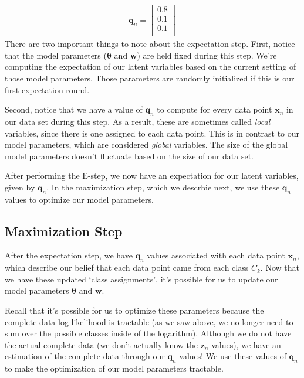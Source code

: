 \begin{align*}
    \textbf{q}_n = \begin{bmatrix}
            0.8 \\
            0.1 \\
            0.1 \\
        \end{bmatrix}
\end{align*}
There are two important things to note about the expectation step. First, notice that the model parameters ($\boldsymbol{\theta}$ and \textbf{w}) are held fixed during this step. We're computing the expectation of our latent variables based on the current setting of those model parameters. Those parameters are randomly initialized if this is our first expectation round.

Second, notice that we have a value of $\textbf{q}_n$ to compute for every data point $\textbf{x}_n$ in our data set during this step. As a result, these are sometimes called \textit{local} variables, since there is one assigned to each data point. This is in contrast to our model parameters, which are considered \textit{global} variables. The size of the global model parameters doesn't fluctuate based on the size of our data set.

After performing the E-step, we now have an expectation for our latent variables, given by $\textbf{q}_n$. In the maximization step, which we descrbie next, we use these $\textbf{q}_n$ values to optimize our model parameters.

\subsection{Maximization Step}
After the expectation step, we have $\textbf{q}_n$ values associated with each data point $\textbf{x}_n$, which describe our belief that each data point came from each class $C_k$. Now that we have these updated `class assignments', it's possible for us to update our model parameters $\boldsymbol{\theta}$ and $\textbf{w}$.

Recall that it's possible for us to optimize these parameters because the complete-data log likelihood is tractable (as we saw above, we no longer need to sum over the possible classes inside of the logarithm). Although we do not have the actual complete-data (we don't actually know the $\textbf{z}_n$ values), we have an estimation of the complete-data through our $\textbf{q}_n$ values! We use these values of $\textbf{q}_n$ to make the optimization of our model parameters tractable.

